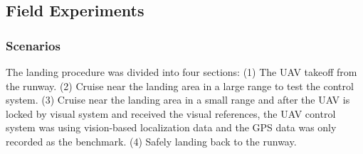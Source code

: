 

\subsection{Field Experiments}
\subsubsection{Scenarios}

The landing procedure was divided into four sections: (1) The UAV takeoff from the runway. (2) Cruise near the landing area in a large range to test the control system. (3) Cruise near the landing area in a small range and after the UAV is locked by visual system and received the visual references, the UAV control system was using vision-based localization data and the GPS data was only recorded as the benchmark. (4) Safely landing back to the runway.






